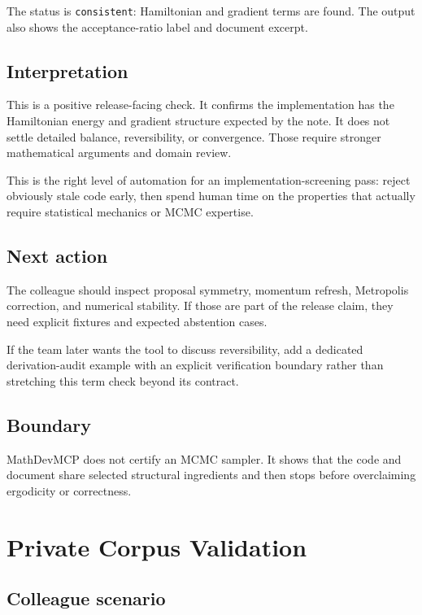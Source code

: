 \documentclass[12pt,a4paper,openany]{book}
\begin{document}
The status is \texttt{consistent}: Hamiltonian and gradient terms are found. The output
also shows the acceptance-ratio label and document excerpt.

\section*{Interpretation}

This is a positive release-facing check. It confirms the implementation has the
Hamiltonian energy and gradient structure expected by the note. It does not
settle detailed balance, reversibility, or convergence. Those require stronger
mathematical arguments and domain review.

This is the right level of automation for an implementation-screening pass:
reject obviously stale code early, then spend human time on the properties that
actually require statistical mechanics or MCMC expertise.

\section*{Next action}

The colleague should inspect proposal symmetry, momentum refresh, Metropolis
correction, and numerical stability. If those are part of the release claim,
they need explicit fixtures and expected abstention cases.

If the team later wants the tool to discuss reversibility, add a dedicated
derivation-audit example with an explicit verification boundary rather than
stretching this term check beyond its contract.

\section*{Boundary}

MathDevMCP does not certify an MCMC sampler. It shows that the code and document
share selected structural ingredients and then stops before overclaiming
ergodicity or correctness.

\chapter{Private Corpus Validation}

\section*{Colleague scenario}
\end{document}
